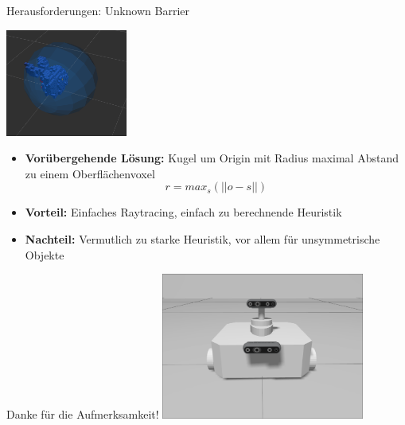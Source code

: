 \documentclass{beamer}
\begin{document}
\begin{frame}{Herausforderungen: Unknown Barrier}
	\begin{block}{}
		\begin{center}
			\includegraphics[width=0.3\textwidth]{Graphics/sphere.png}
		\end{center}
		\begin{itemize}
			\item \textbf{Vorübergehende Lösung:} Kugel um Origin mit Radius maximal Abstand zu einem Oberflächenvoxel \[r = max_s(||o-s||)\]
			\item \textbf{Vorteil:} Einfaches Raytracing, einfach zu berechnende Heuristik
			\item \textbf{Nachteil:} Vermutlich zu starke Heuristik, vor allem für unsymmetrische Objekte
		\end{itemize}
	\end{block}
\end{frame}
\begin{frame}{}
	\centering
	\Large{Danke für die Aufmerksamkeit!}
	\vfill
	\includegraphics[width=0.5\textwidth]{Graphics/tb.png}
\end{frame}

\printbibliography
\end{document}
